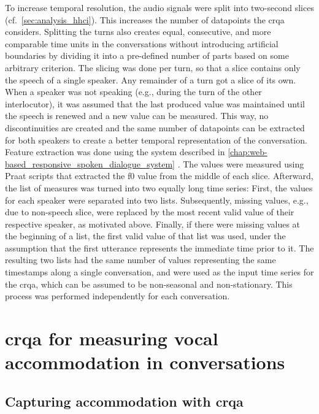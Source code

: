 To increase temporal resolution, the audio signals were split into two-second slices (cf.\ \cref{sec:analysis_hhci}).
This increases the number of datapoints the \ac{crqa} considers.
Splitting the turns also creates equal, consecutive, and more comparable time units in the conversations without introducing artificial boundaries by dividing it into a pre-defined number of parts based on some arbitrary criterion.
The slicing was done per turn, so that a slice contains only the speech of a single speaker.
Any remainder of a turn got a slice of its own.
When a speaker was not speaking (e.g., during the turn of the other interlocutor), it was assumed that the last produced value was maintained until the speech is renewed and a new value can be measured.
This way, no discontinuities are created and the same number of datapoints can be extracted for both speakers to create a better temporal representation of the conversation.
Feature extraction was done using the system described in \cref{chap:web-based_responsive_spoken_dialogue_system} \citep[and see][]{Raveh2018Specom}.
The values were measured using Praat \citep{Boersma2018praat} scripts that extracted the \ac{f0} value from the middle of each slice.
Afterward, the list of measures was turned into two equally long time series:
First, the values for each speaker were separated into two lists.
Subsequently, missing values, e.g., due to non-speech slice, were replaced by the most recent valid value of their respective speaker, as motivated above.
Finally, if there were missing values at the beginning of a list, the first valid value of that list was used, under the assumption that the first utterance represents the immediate time prior to it.
The resulting two lists had the same number of values representing the same timestamps along a single conversation, and were used as the input time series for the \ac{crqa}, which can be assumed to be non-seasonal and non-stationary.
This process was performed independently for each conversation.

\section[\Acl{crqa}]{\Acl{crqa} for measuring vocal accommodation in conversations}
\label{sec:crqa}

\subsection{Capturing accommodation with \acs{crqa}}
\label{subsec:capturing_behaviors}

